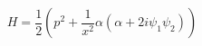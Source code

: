 \begin{equation}
H=\frac{1}{2}\left(p^2+\frac{1}{x^2}
\alpha(\alpha+2i\psi_1\psi_2)\right)
\label{intsc}
\end{equation}


